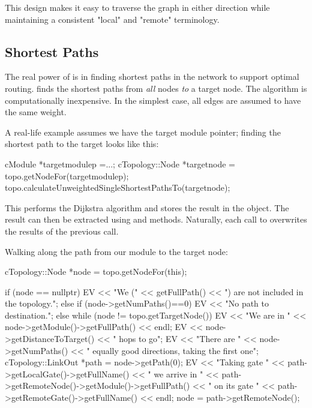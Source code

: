 This design makes it easy to traverse the graph in either direction while
maintaining a consistent "local" and "remote" terminology.

\subsection{Shortest Paths}
\label{sec:sim-lib:ctopology-shortest-paths}

The real power of  is in finding shortest
paths in the network to support optimal
routing.  finds the shortest paths
from \textit{all} nodes \textit{to} a target node. The algorithm is
computationally inexpensive. In the simplest case, all edges are
assumed to have the same weight.

A real-life example assumes we have the target module pointer; finding
the shortest path to the target looks like this:

\begin{cpp}
cModule *targetmodulep =...;
cTopology::Node *targetnode = topo.getNodeFor(targetmodulep);
topo.calculateUnweightedSingleShortestPathsTo(targetnode);
\end{cpp}

This performs the Dijkstra algorithm and
stores the result in the  object. The result can
then be extracted using  and
 methods. Naturally, each call to
 overwrites the results of
the previous call.

Walking along the path from our module to the target node:

\begin{cpp}
cTopology::Node *node = topo.getNodeFor(this);

if (node == nullptr) {
  EV << "We (" << getFullPath() << ") are not included in the topology.\n";
}
else if (node->getNumPaths()==0) {
  EV << "No path to destination.\n";
}
else {
  while (node != topo.getTargetNode()) {
    EV << "We are in " << node->getModule()->getFullPath() << endl;
    EV << node->getDistanceToTarget() << " hops to go\n";
    EV << "There are " << node->getNumPaths()
       << " equally good directions, taking the first one\n";
    cTopology::LinkOut *path = node->getPath(0);
    EV << "Taking gate " << path->getLocalGate()->getFullName()
       << " we arrive in " << path->getRemoteNode()->getModule()->getFullPath()
       << " on its gate " << path->getRemoteGate()->getFullName() << endl;
    node = path->getRemoteNode();
  }
}
\end{cpp}

